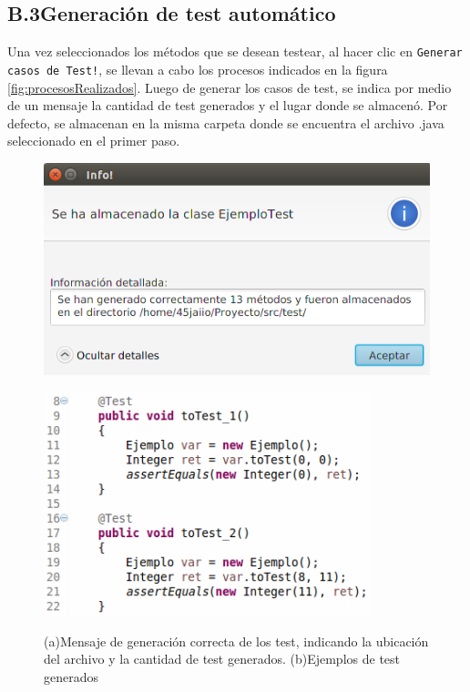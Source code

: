 \documentclass{llncs}
\begin{document}
    \subsection*{B.3\enspace Generación de test automático}
    Una vez seleccionados los métodos que se desean testear, al hacer clic en \texttt{Generar casos de Test!}, se llevan a cabo los procesos indicados en la figura
    \ref{fig:procesosRealizados}. Luego de generar los casos de test, se indica por medio de un mensaje la cantidad de test generados y el lugar donde se almacenó.
    Por defecto, se almacenan en la misma carpeta donde se encuentra el archivo .java seleccionado en el primer paso.
    \begin{figure}[hbt!]
     \centering
      \begin{minipage}[H]{0.45\textwidth}
      \centering
      \includegraphics[width=1\textwidth]{screenshots/3-generados}
    \end{minipage}
    \centering
    \begin{minipage}[H]{0.45\textwidth}
      \centering
      \includegraphics[width=0.85\textwidth]{screenshots/EjemploTestGen}\\
    \end{minipage}
    \caption{(a)Mensaje de generación correcta de los test, indicando la ubicación del archivo y la cantidad de test generados. (b)Ejemplos de test generados}
    \end{figure}
    
\end{document}
